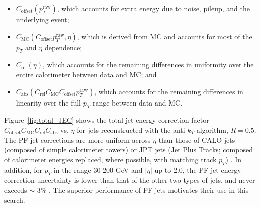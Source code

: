 \documentclass[dissertation.tex]{subfiles}
\begin{document}
\begin{itemize}
\item $C_{\mathrm{offset}}(p_{T}^{\mathrm{raw}})$, which accounts for extra energy due to noise, pileup, and the underlying event;
\item $C_{\mathrm{MC}}(C_{\mathrm{offset}}p_{T}^{\mathrm{raw}}, \eta)$, which is derived from MC and accounts for most of the $p_{T}$ and $\eta$ dependence;
\item $C_{\mathrm{rel}}(\eta)$, which accounts for the remaining differences in uniformity over the entire calorimeter between data and MC; and
\item $C_{\mathrm{abs}}(C_{\mathrm{rel}}C_{\mathrm{MC}}C_{\mathrm{offset}}p_{T}^{\mathrm{raw}})$, which accounts for the remaining differences in linearity over the full $p_{T}$ range between data and MC.
\end{itemize}

Figure~\ref{fig:total_JEC} shows the total jet energy correction factor $C_{\mathrm{offset}}C_{\mathrm{MC}}C_{\mathrm{rel}}C_{\mathrm{abs}}$ vs. $\eta$ for jets reconstructed with the anti-$k_{T}$ algorithm, $R = 0.5$.  The PF jet corrections are more uniform across $\eta$ than those of CALO jets (composed of simple calorimeter towers) or JPT jets (Jet Plus Tracks; composed of calorimeter energies replaced, where possible, with matching track $p_{T}$) \cite{JPT}.  In addition, for $p_{T}$ in the range 30-200 GeV and $|\eta|$ up to 2.0, the PF jet energy correction uncertainty is lower than that of the other two types of jets, and never exceeds $\sim$ 3\% \cite{1748-0221-6-11-P11002}.  The superior performance of PF jets motivates their use in this search.
\end{document}
